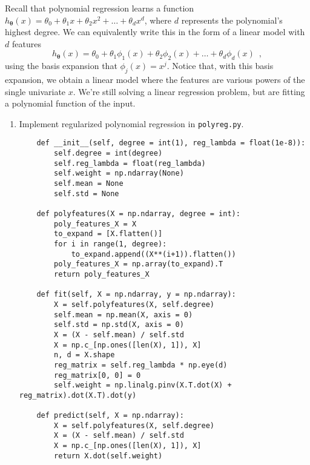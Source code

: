 \documentclass{article}
\begin{document}
\begin{aprob}
    Recall that polynomial regression learns a function $h_{\bm{\theta}}(x) = \theta_0 + \theta_1 x + \theta_2 x^2 + \ldots + \theta_d x^d$, where $d$ represents the polynomial's highest degree.  We can equivalently write this in the form of a  linear model with $d$ features
    \begin{equation}
        h_{\bm{\theta}}(x) = \theta_0 + \theta_1 \phi_1(x)  + \theta_2 \phi_2(x)  + \ldots + \theta_d \phi_d(x)  \enspace ,
    \end{equation}
    using the basis expansion that $\phi_j(x) = x^j$.  Notice that, with this basis expansion, we obtain a linear model where the features are various powers of the single univariate $x$.  We're still solving a linear regression problem, but are fitting a polynomial function of the input.\\
    
    \begin{enumerate}
        \item {} Implement regularized polynomial regression in \texttt{polyreg.py}.  
    
    \begin{lstlisting}
    def __init__(self, degree = int(1), reg_lambda = float(1e-8)):
        self.degree = int(degree)
        self.reg_lambda = float(reg_lambda)
        self.weight = np.ndarray(None)
        self.mean = None 
        self.std = None
        
    def polyfeatures(X = np.ndarray, degree = int):
        poly_features_X = X
        to_expand = [X.flatten()]
        for i in range(1, degree):
            to_expand.append((X**(i+1)).flatten())
        poly_features_X = np.array(to_expand).T
        return poly_features_X
        
    def fit(self, X = np.ndarray, y = np.ndarray):
        X = self.polyfeatures(X, self.degree)
        self.mean = np.mean(X, axis = 0)
        self.std = np.std(X, axis = 0)
        X = (X - self.mean) / self.std
        X = np.c_[np.ones([len(X), 1]), X]
        n, d = X.shape
        reg_matrix = self.reg_lambda * np.eye(d)
        reg_matrix[0, 0] = 0
        self.weight = np.linalg.pinv(X.T.dot(X) + reg_matrix).dot(X.T).dot(y)
        
    def predict(self, X = np.ndarray):
        X = self.polyfeatures(X, self.degree)
        X = (X - self.mean) / self.std
        X = np.c_[np.ones([len(X), 1]), X]
        return X.dot(self.weight)
    \end{lstlisting}


\end{enumerate}
\end{aprob}
\end{document}
